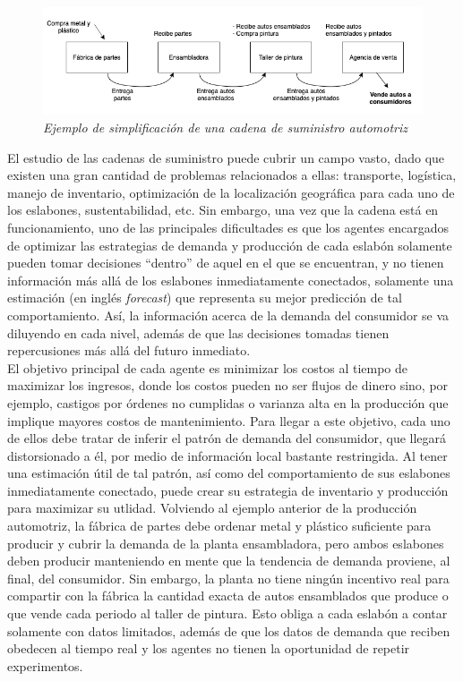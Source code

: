 \begin{figure}[ht]
\caption{\textit{Ejemplo de simplificaci\'on de una cadena de suministro automotriz}}
\label{automotriz}
\includegraphics[width=15cm]{tesis_tex/figs/auto_chain_simple.png}
\centering
\end{figure}


El estudio de las cadenas de suministro puede cubrir un campo vasto, dado que existen una gran cantidad de problemas relacionados a ellas: transporte, log\'istica, manejo de inventario, optimizaci\'on de la localizaci\'on geogr\'afica para cada uno de los eslabones, sustentabilidad, etc. Sin embargo, una vez que la cadena est\'a en funcionamiento, uno de las principales dificultades es que los agentes encargados de optimizar las estrategias de demanda y producci\'on de cada eslab\'on solamente pueden tomar decisiones ``dentro'' de aquel en el que se encuentran, y no tienen informaci\'on m\'as all\'a de los eslabones inmediatamente conectados, solamente una estimaci\'on (en ingl\'es \textit{forecast}) que representa su mejor predicci\'on de tal comportamiento. As\'i, la informaci\'on acerca de la demanda del consumidor se va diluyendo en cada nivel, además de que las decisiones tomadas tienen repercusiones m\'as all\'a del futuro inmediato. \\

El objetivo principal de cada agente es minimizar los costos al tiempo de maximizar los ingresos, donde los costos pueden no ser flujos de dinero sino, por ejemplo, castigos por \'ordenes no cumplidas o varianza alta en la producci\'on que implique mayores costos de mantenimiento. Para llegar a este objetivo, cada uno de ellos debe tratar de inferir el patr\'on de demanda del consumidor, que llegar\'a distorsionado a \'el, por medio de información local bastante restringida. Al tener una estimaci\'on \'util de tal patr\'on, as\'i como del comportamiento de sus eslabones inmediatamente conectado, puede crear su estrategia de inventario y producci\'on para maximizar su utlidad. Volviendo al ejemplo anterior de la producci\'on automotriz, la f\'abrica de partes debe ordenar metal y pl\'astico suficiente para producir y cubrir la demanda de la planta ensambladora, pero ambos eslabones deben producir manteniendo en mente que la tendencia de demanda proviene, al final, del consumidor. Sin embargo, la planta no tiene ning\'un incentivo real para compartir con la f\'abrica la cantidad exacta de autos ensamblados que produce o que vende cada periodo al taller de pintura. Esto obliga a cada eslab\'on a contar solamente con datos limitados, adem\'as de que los datos de demanda que reciben obedecen al tiempo real y los agentes no tienen la oportunidad de repetir experimentos.\\

